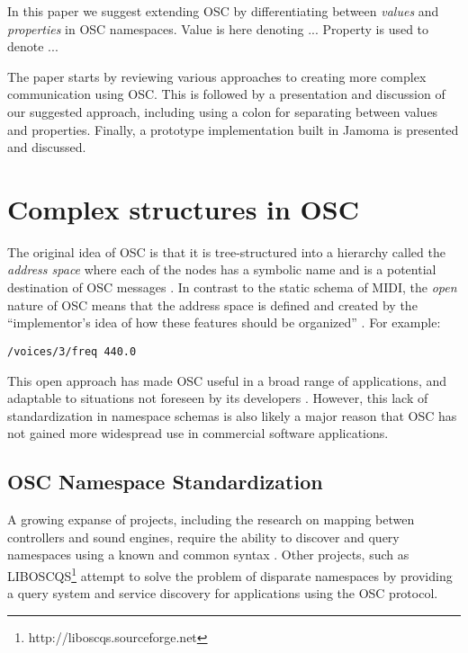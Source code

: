 \documentclass{NIME-alternate}
\begin{document}
In this paper we suggest extending OSC by differentiating between \emph{values} and \emph{properties} in OSC namespaces. Value is here denoting ... Property is used to denote ...

The paper starts by reviewing various approaches to creating more complex communication using OSC. This is followed by a presentation and discussion of our suggested approach, including using a colon for separating between values and properties. Finally, a prototype implementation built in Jamoma is presented and discussed. 





\section{Complex structures in OSC} %
\label{sec:representing_complex_structures_in_an_OSC_namespace}


The original idea of OSC is that it is tree-structured into a hierarchy called the \emph{address space} where each of the nodes has a symbolic name and is a potential destination of OSC messages \cite{Wright:1997}. In contrast to the static schema of MIDI, the \emph{open} nature of OSC means that the address space is defined and created by the ``implementor’s idea of how these features should be organized'' \cite[p153]{Wright:2003}. For example: 

\noindent
\texttt{/voices/3/freq 440.0}

This open approach has made OSC useful in a broad range of applications, and adaptable to situations not foreseen by its developers \cite{Wright:2005}.  However, this lack of standardization in namespace schemas is also likely a major reason that OSC has not gained more widespread use in commercial software applications.



\subsection{OSC Namespace Standardization}

A growing expanse of projects, including the research on mapping betwen controllers and sound engines, require the ability to discover and query namespaces using a known and common syntax \cite{Malloch:2007}. Other projects, such as LIBOSCQS\footnote{http://liboscqs.sourceforge.net} attempt to solve the problem of disparate namespaces by providing a query system and service discovery for applications using the OSC protocol\cite{Habets:2005}\cite{Schmeder:2004oscqs}.
\end{document}
